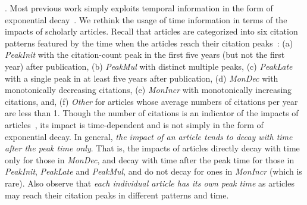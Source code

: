 . Most previous work simply exploits temporal information in the form of exponential decay~\cite{Li08TSRanking,Wang13AAAI,sayyadi09,WalkerXKM07}. We rethink the usage of time information in terms of the impacts of scholarly articles.
Recall that articles are categorized  into six citation patterns featured by the time when the articles reach their citation peaks~\cite{Chakraborty15}: (a) {\em PeakInit} with the citation-count peak in the first five years (but not the first year) after publication, (b) {\em PeakMul} with distinct multiple peaks, (c) {\em PeakLate} with a single peak in at least five years after publication, (d) {\em MonDec} with monotonically decreasing citations, (e) {\em MonIncr} with monotonically increasing citations, and, (f) {\em Other} for articles whose average numbers of citations per year are less than 1. Though the number of citations is an indicator of the impacts of articles~\cite{WangSB13,Garfield471}, its impact is time-dependent and is not simply in the form of exponential decay.
In general, {\em the impact of an article tends to decay with time after the peak time only}. That is, the impacts of articles directly decay with time only for those in {\em MonDec}, and decay with time after the peak time for those in {\em PeakInit}, {\em PeakLate} and {\em PeakMul}, and do not decay for ones in {\em MonIncr} (which is rare).
Also observe that {\em each individual article has its own peak time} as articles may reach their citation peaks in different patterns and time.



